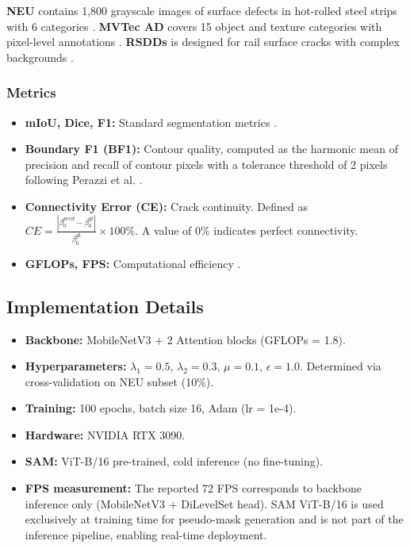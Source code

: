 \documentclass[12pt, a4paper]{article}
\begin{document}
\textbf{NEU} contains 1,800 grayscale images of surface defects in hot-rolled steel strips with 6 categories \cite{review2025}. \textbf{MVTec AD} covers 15 object and texture categories with pixel-level annotations \cite{review2025}. \textbf{RSDDs} is designed for rail surface cracks with complex backgrounds \cite{review2025}.

\subsubsection{Metrics}

\begin{itemize}
    \item \textbf{mIoU, Dice, F1:} Standard segmentation metrics \cite{review2025}.
    \item \textbf{Boundary F1 (BF1):} Contour quality, computed as the harmonic mean of precision and recall of contour pixels with a tolerance threshold of 2 pixels following Perazzi et al. \cite{boundary_f1_2019}.
    \item \textbf{Connectivity Error (CE):} Crack continuity. Defined as $CE = \frac{|\beta_0^{pred} - \beta_0^{gt}|}{\beta_0^{gt}} \times 100\%$. A value of 0\% indicates perfect connectivity.
    \item \textbf{GFLOPs, FPS:} Computational efficiency \cite{review2025}.
\end{itemize}

\subsection{Implementation Details}
\label{subsec:implementation}

\begin{itemize}
    \item \textbf{Backbone:} MobileNetV3 + 2 Attention blocks (GFLOPs = 1.8).
    \item \textbf{Hyperparameters:} $\lambda_1 = 0.5$, $\lambda_2 = 0.3$, $\mu = 0.1$, $\epsilon = 1.0$. Determined via cross-validation on NEU subset (10\%).
    \item \textbf{Training:} 100 epochs, batch size 16, Adam (lr = 1e-4).
    \item \textbf{Hardware:} NVIDIA RTX 3090.
    \item \textbf{SAM:} ViT-B/16 pre-trained, cold inference (no fine-tuning).
    \item \textbf{FPS measurement:} The reported 72 FPS corresponds to backbone inference only (MobileNetV3 + DiLevelSet head). SAM ViT-B/16 is used exclusively at training time for pseudo-mask generation and is not part of the inference pipeline, enabling real-time deployment.
\end{itemize}
\end{document}
